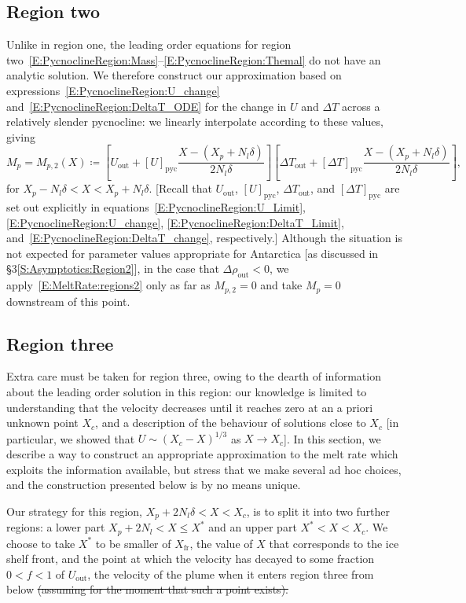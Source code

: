 \documentclass[openacc]{rsproca_new}%
\newcommand{\red}[1]{{\color{red} #1}}
\newcommand{\blue}[1]{{\color{blue} #1}}
\newcommand{\rout}[1]{\red{\st{#1}}}\newcommand{\ab}[1]{\textcolor{Green}{#1}}\newcommand{\about}[1]{\textcolor{Cyan}{\sout{#1}}}
\newcommand{\lt}{\delta} %
\newcommand{\out}{\text{out}}
\begin{document}
\subsection{Region two}
Unlike in region one, the leading order equations for region two~\eqref{E:PycnoclineRegion:Mass}--\eqref{E:PycnoclineRegion:Themal} do not have an analytic solution. We therefore construct our approximation based on expressions~\eqref{E:PycnoclineRegion:U_change} and~\eqref{E:PycnoclineRegion:DeltaT_ODE} for the change in $U$ and $\Delta T$ across a relatively slender pycnocline: we linearly interpolate according to these values, giving
\begin{equation}\label{E:MeltRate:regions2}
M_{p} = M_{p,2}(X) \coloneqq \left[U_{\out} + \left[U\right]_{\text{pyc}} \frac{X - (X_p + N_l \lt)}{2N_l \lt}\right]  \left[\Delta T_{\out} +  \left[\Delta T\right]_{\text{pyc}} \frac{X - (X_p + N_l \lt)}{2N_l \lt}\right] , 
\end{equation}
for $ X_p - N_l \lt  < X < X_p + N_l \lt$. [Recall that $U_\out$, $\left[U\right]_{\text{pyc}}$, $\Delta T_\out$, and $\left[\Delta T\right]_{\text{pyc}}$ are set out explicitly in equations~\eqref{E:PycnoclineRegion:U_Limit}, \eqref{E:PycnoclineRegion:U_change}, \eqref{E:PycnoclineRegion:DeltaT_Limit}, and~\eqref{E:PycnoclineRegion:DeltaT_change}, respectively.] Although the situation is not expected for parameter values appropriate for Antarctica [as discussed in \S3\ref{S:Asymptotics:Region2}], in the case that $\Delta \rho_\out < 0$, we apply~\eqref{E:MeltRate:regions2} only as far as $M_{p,2} = 0$ and take $M_{p} = 0$ downstream of this point.


\subsection{Region three}\label{S:MeltRate:R3}
Extra care must be taken for region three, owing to the dearth of information about the leading order solution in this region: our knowledge is limited to understanding that the velocity decreases until it reaches zero at an a priori unknown point $X_c$, and a description of the behaviour of solutions close to $X_c$ [in particular, we showed that $U \sim (X_c - X)^{1/3}$ as $X \to X_c$]. In this section, we describe a way to construct an appropriate approximation to the melt rate which exploits the information available, but stress that we make several ad hoc choices, and the construction presented below is by no means unique.

Our strategy for this region, $X_p + 2N_l \lt < X < X_c$, is to split it into two further regions: a lower part $X_p + 2 N_l < X \leq X^*$ and an upper part $X^* < X < X_c$. We choose to take $X^*$ to be \blue{smaller of $X_{\text{fr}}$, the value of $X$ that corresponds to the ice shelf front, and} the point at which the velocity has decayed to some fraction $0 < f < 1$ of $U_\out$, the velocity of the plume when it enters region three from below \rout{(assuming for the moment that such a point exists).}
\end{document}
